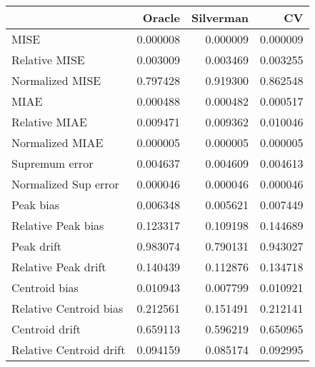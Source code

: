 \begin{tabular}{lrrr}
  \toprule
 & Oracle & Silverman & CV \\ 
  \midrule
MISE & 0.000008 & 0.000009 & 0.000009 \\ 
  Relative MISE & 0.003009 & 0.003469 & 0.003255 \\ 
  Normalized MISE & 0.797428 & 0.919300 & 0.862548 \\ 
  MIAE & 0.000488 & 0.000482 & 0.000517 \\ 
  Relative MIAE & 0.009471 & 0.009362 & 0.010046 \\ 
  Normalized MIAE & 0.000005 & 0.000005 & 0.000005 \\ 
  Supremum error & 0.004637 & 0.004609 & 0.004613 \\ 
  Normalized Sup error & 0.000046 & 0.000046 & 0.000046 \\ 
  Peak bias & 0.006348 & 0.005621 & 0.007449 \\ 
  Relative Peak bias & 0.123317 & 0.109198 & 0.144689 \\ 
  Peak drift & 0.983074 & 0.790131 & 0.943027 \\ 
  Relative Peak drift & 0.140439 & 0.112876 & 0.134718 \\ 
  Centroid bias & 0.010943 & 0.007799 & 0.010921 \\ 
  Relative Centroid bias & 0.212561 & 0.151491 & 0.212141 \\ 
  Centroid drift & 0.659113 & 0.596219 & 0.650965 \\ 
  Relative Centroid drift & 0.094159 & 0.085174 & 0.092995 \\ 
   \bottomrule
\end{tabular}
